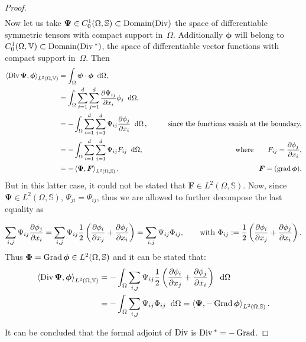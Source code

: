\begin{theorem}
\begin{proof}
\begin{equation*}
\begin{aligned}
		\end{aligned}
		\end{equation*}
		Now let us take $\bm{\Psi} \in {C}_0^1(\Omega, \mathbb{S}) \subset \mathrm{Domain}(\operatorname*{Div})$ the space of differentiable symmetric tensors with compact support in~$\Omega$. Additionally $\bm{\phi}$ will belong to ${C}_0^1(\Omega, \mathbb{V}) \subset \mathrm{Domain}(\operatorname*{Div}{}^*)$, the space of differentiable vector functions with compact support in~$\Omega$. Then
		\begin{equation*}
		\begin{aligned}
		\left\langle \Div\bm{\Psi} , \bm{\phi} \right\rangle_{L^2(\Omega, \mathbb{V})} &= \int_{\Omega}  \bm{\psi} \cdot \bm{\phi} \; \d\Omega, \\
		&= \int_{\Omega} \sum_{i=1}^d \sum_{j=1}^d \diffp{\Psi_{ij}}{x_i} \phi_j \; \d\Omega,  \\ 
		&= - \int_{\Omega} \sum_{i=1}^d \sum_{j=1}^d \Psi_{ij} \diffp{\phi_j}{x_i} \; \d\Omega\,, \qquad &\text{since the functions vanish at the boundary,}\\
		&= - \int_{\Omega} \sum_{i=1}^d \sum_{j=1}^d \Psi_{ij} {F}_{ij} \;\d\Omega,  \qquad &\where {F}_{ij} = \diffp{\phi_j}{x_i},\\
		&= - \left\langle \bm{\Psi} , \bm{F} \right\rangle_{L^2(\Omega, \mathbb{S})},  \qquad &\bm{F} = (\grad{\bm\phi}).
		\end{aligned}	 
		\end{equation*}
		But in this latter case, it could not  be stated that $\bm{F} \in L^2(\Omega, \mathbb{S})$. Now, since  $\bm{\Psi} \in L^2(\Omega, \mathbb{S})$, $\Psi_{ji}=\Psi_{ij}$,  thus we are  allowed to further decompose the last equality as
		
		\begin{equation*} \sum_{i,j}\Psi_{ij} \diffp{\phi_j}{x_i} = \sum_{i,j}\Psi_{ij} \frac{1}{2} \left(\diffp{\phi_i}{x_j} + \diffp{\phi_j}{x_i}  \right) = 	\sum_{i,j} \Psi_{ij} {\Phi}_{ij}, \qquad \text{with } {\Phi}_{ij}:= \frac{1}{2} \left(\diffp{\phi_i}{x_j} + \diffp{\phi_j}{x_i}  \right).
		\end{equation*}
		Thus $\bm{\Phi}=\operatorname*{Grad} \bm{\phi} \in L^2(\Omega, \mathbb{S})$ and it can be stated that:
		\begin{align*}
		\left\langle \Div\bm{\Psi} , \bm{\phi} \right\rangle_{L^2(\Omega, \mathbb{V})} &= - \int_{\Omega} \sum_{i,j} \Psi_{ij} \frac{1}{2} \left(\diffp{\phi_i}{x_j} + \diffp{\phi_j}{x_i}  \right) \;\d\Omega \\
		&= - \int_{\Omega} \sum_{i,j} \Psi_{ij} \Phi_{ij} \;\d\Omega = \left\langle \bm{\Psi} , -\Grad \bm{\phi} \right\rangle_{L^2(\Omega, \mathbb{S})}.
		\end{align*}

		It can be concluded that the formal adjoint of $\operatorname*{Div}$ is $\operatorname*{Div}{}^* = -\operatorname*{Grad}$.
	\end{proof}
\end{theorem}

